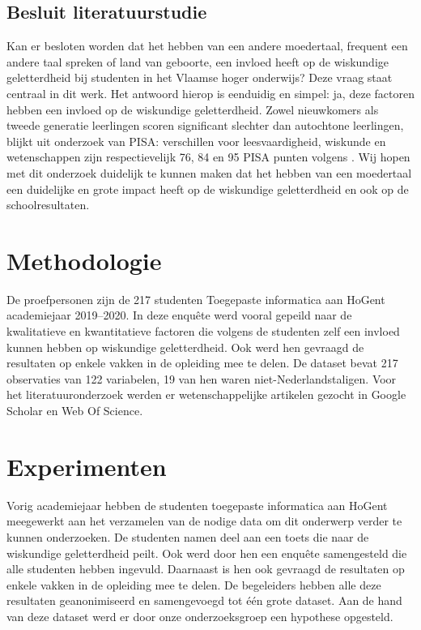 \documentclass{hogent-article}
\begin{document}
\subsection*{Besluit literatuurstudie}

Kan er besloten worden dat het hebben van een andere moedertaal, frequent een andere taal spreken of land van geboorte, een invloed heeft op de wiskundige geletterdheid bij studenten in het Vlaamse hoger onderwijs? Deze vraag staat centraal in dit werk. Het antwoord hierop is eenduidig en simpel: ja, deze factoren hebben een invloed op de wiskundige geletterdheid. Zowel nieuwkomers als tweede generatie leerlingen scoren significant slechter dan autochtone leerlingen, blijkt uit onderzoek van PISA: verschillen voor leesvaardigheid, wiskunde en wetenschappen zijn respectievelijk 76, 84 en 95 PISA punten volgens \textcite{Agirdag2014}. Wij hopen met dit onderzoek duidelijk te kunnen maken dat het hebben van een moedertaal een duidelijke en grote impact heeft op de wiskundige geletterdheid en ook op de schoolresultaten.

\section{Methodologie}\label{sec:methodologie}

De proefpersonen zijn de 217 studenten Toegepaste informatica aan HoGent academiejaar 2019--2020. In deze enqu\^ete werd vooral gepeild naar de kwalitatieve en kwantitatieve factoren die volgens de studenten zelf een invloed kunnen hebben op wiskundige geletterdheid. Ook werd hen gevraagd de resultaten op enkele vakken in de opleiding mee te delen. De dataset bevat 217 observaties van 122 variabelen, 19 van hen waren niet-Nederlandstaligen. Voor het literatuuronderzoek werden er wetenschappelijke artikelen gezocht in Google Scholar en Web Of Science.

\section{Experimenten}\label{sec:experimenten}

Vorig academiejaar hebben de studenten toegepaste informatica aan HoGent meegewerkt aan het verzamelen van de nodige data om dit onderwerp verder te kunnen onderzoeken. De studenten namen deel aan een toets die naar de wiskundige geletterdheid peilt. Ook werd door hen een enqu\^ete samengesteld die alle studenten hebben ingevuld. Daarnaast is hen ook gevraagd de resultaten op enkele vakken in de opleiding mee te delen. De begeleiders hebben alle deze resultaten geanonimiseerd en samengevoegd tot \'e\'en grote dataset. Aan de hand van deze dataset werd er door onze onderzoeksgroep een hypothese opgesteld.
\end{document}
